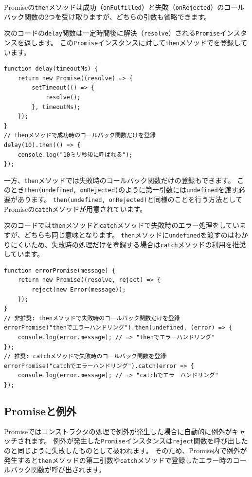 Promiseの\texttt{then}メソッドは成功（\texttt{onFulfilled}）と失敗（\texttt{onRejected}）のコールバック関数の2つを受け取りますが、どちらの引数も省略できます。

次のコードの\texttt{delay}関数は一定時間後に解決（\texttt{resolve}）される\texttt{Promise}インスタンスを返します。
この\texttt{Promise}インスタンスに対して\texttt{then}メソッドで\textbf{}を登録しています。

\begin{lstlisting}
function delay(timeoutMs) {
    return new Promise((resolve) => {
        setTimeout(() => {
            resolve();
        }, timeoutMs);
    });
}
// thenメソッドで成功時のコールバック関数だけを登録
delay(10).then(() => {
    console.log("10ミリ秒後に呼ばれる");
});
\end{lstlisting}

一方、\texttt{then}メソッドでは失敗時のコールバック関数だけの登録もできます。
このとき\texttt{then(undefined, onRejected)}のように第一引数には\texttt{undefined}を渡す必要があります。
\texttt{then(undefined, onRejected)}と同様のことを行う方法としてPromiseの\texttt{catch}メソッドが用意されています。

次のコードでは\texttt{then}メソッドと\texttt{catch}メソッドで失敗時のエラー処理をしていますが、どちらも同じ意味となります。
\texttt{then}メソッドに\texttt{undefined}を渡すのはわかりにくいため、失敗時の処理だけを登録する場合は\texttt{catch}メソッドの利用を推奨しています。

\begin{lstlisting}
function errorPromise(message) {
    return new Promise((resolve, reject) => {
        reject(new Error(message));
    });
}
// 非推奨: thenメソッドで失敗時のコールバック関数だけを登録
errorPromise("thenでエラーハンドリング").then(undefined, (error) => {
    console.log(error.message); // => "thenでエラーハンドリング"
});
// 推奨: catchメソッドで失敗時のコールバック関数を登録
errorPromise("catchでエラーハンドリング").catch(error => {
    console.log(error.message); // => "catchでエラーハンドリング"
});
\end{lstlisting}

\hypertarget{promise-exception}{%
\subsection{Promiseと例外}\label{promise-exception}}

Promiseではコンストラクタの処理で例外が発生した場合に自動的に例外がキャッチされます。
例外が発生した\texttt{Promise}インスタンスは\texttt{reject}関数を呼び出したのと同じように失敗したものとして扱われます。
そのため、Promise内で例外が発生すると\texttt{then}メソッドの第二引数や\texttt{catch}メソッドで登録したエラー時のコールバック関数が呼び出されます。

